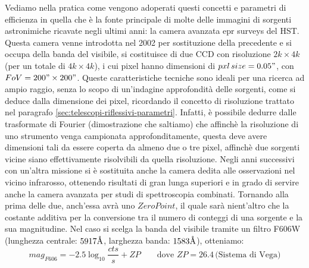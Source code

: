 \begin{exmp}
	Vediamo nella pratica come vengono adoperati questi concetti e parametri di efficienza in quella che è la fonte principale di molte delle immagini di sorgenti astronimiche ricavate negli ultimi anni: la camera avanzata epr surveys del HST. Questa camera venne introdotta nel 2002 per sostituzione della precedente e si occupa della banda del visibile, si costituisce di due CCD con risoluzione $2k \times 4k$ (per un totale di $4k \times 4k$), i cui pixel hanno dimensioni di $pxl \, size=0.05"$, con $FoV=200" \times 200"$. Queste caratteristiche tecniche sono ideali per una ricerca ad ampio raggio, senza lo scopo di un'indagine approfondità delle sorgenti, come si deduce dalla dimensione dei pixel, ricordando il concetto di risoluzione trattato nel paragrafo \ref{sec:telescopi-riflessivi-parametri}. Infatti, è possibile dedurre dalle trasformate di Fourier (dimostrazione che saltiamo) che affinchè la risoluzione di uno strumento venga campionata approfonditamente, questa deve avere dimensioni tali da essere coperta da almeno due o tre pixel, affinchè due sorgenti vicine siano effettivamente risolvibili da quella risoluzione. Negli anni successivi con un'altra missione si è sostituita anche la camera dedita alle osservazioni nel vicino infrarosso, ottenendo risultati di gran lunga superiori e in grado di servire anche la camera avanzata per studi di spettroscopia combinati. Tornando alla prima delle due, anch'essa avrà uno $ZeroPoint$, il quale sarà nient'altro che la costante additiva per la conversione tra il numero di conteggi di una sorgente e la sua magnitudine. Nel caso si scelga la banda del visibile tramite un filtro F606W (lunghezza centrale: $5917\mbox{\normalfont\AA}$, larghezza banda: $1583\mbox{\normalfont\AA}$), otteniamo:
	\begin{equation*}
		mag_{F606}=-2.5\log_{10}\frac{cts}{s}+ZP \qquad
		\text{dove } ZP=26.4 \, \text{(Sistema di Vega)}
	\end{equation*}

\end{exmp}
